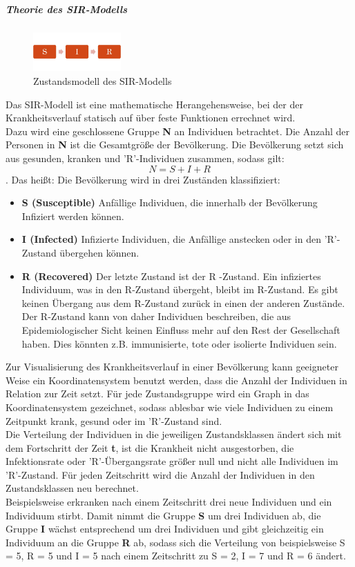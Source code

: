 \subparagraph{Theorie des SIR-Modells}
\begin{figure}
\includegraphics[width= 0.3\textwidth]{./images/SIR-Modell.jpg}\caption{Zustandsmodell des SIR-Modells}
\end{figure}
Das SIR-Modell ist eine mathematische Herangehensweise, bei der der Krankheitsverlauf statisch auf über feste Funktionen errechnet wird. \\
Dazu wird eine geschlossene Gruppe \textbf{N} an Individuen betrachtet. Die Anzahl der Personen in \textbf{N} ist die Gesamtgröße der Bevölkerung. Die Bevölkerung setzt sich aus gesunden, kranken und 'R'-Individuen zusammen, sodass gilt:
\begin{equation}
N = S + I + R
\end{equation}
. Das heißt: Die Bevölkerung wird in drei Zuständen klassifiziert:
\begin{itemize}
\item \textbf{S (Susceptible)} Anfällige Individuen, die innerhalb der Bevölkerung Infiziert werden können.
\item \textbf{I (Infected)} Infizierte Individuen, die Anfällige anstecken  oder in den 'R'-Zustand übergehen können.
\item \textbf{R (Recovered)} Der letzte Zustand ist der \gllqq R \glrqq-Zustand. Ein infiziertes Individuum, was in den \gllqq R\gllqq -Zustand übergeht, bleibt im R-Zustand. Es gibt keinen Übergang aus dem R-Zustand zurück in einen der anderen Zustände. Der R-Zustand kann von daher Individuen beschreiben, die aus Epidemiologischer Sicht keinen Einfluss mehr auf den Rest der Gesellschaft haben. Dies könnten z.B. immunisierte, tote oder isolierte Individuen sein.
\end{itemize}
Zur Visualisierung des Krankheitsverlauf in einer Bevölkerung kann geeigneter Weise ein Koordinatensystem benutzt werden, dass die Anzahl der Individuen in Relation zur Zeit setzt.
Für jede Zustandsgruppe wird ein Graph in das Koordinatensystem gezeichnet, sodass ablesbar wie viele Individuen zu einem Zeitpunkt krank, gesund oder im 'R'-Zustand sind.\\
Die Verteilung der Individuen in die jeweiligen Zustandsklassen ändert sich mit dem Fortschritt der Zeit \textbf{t}, ist die Krankheit nicht ausgestorben, die Infektionsrate oder 'R'-Übergangsrate größer null und nicht alle Individuen im 'R'-Zustand.
Für jeden Zeitschritt wird die Anzahl der Individuen in den Zustandsklassen neu berechnet.\\
Beispielsweise erkranken nach einem Zeitschritt drei neue Individuen und ein Individuum stirbt. Damit nimmt die Gruppe  \textbf{S} um drei Individuen ab, die Gruppe \textbf{I} wächst entsprechend um drei Individuen und gibt gleichzeitig ein Individuum an die Gruppe \textbf{R} ab, sodass sich die Verteilung von beispielsweise S = 5, R = 5 und I = 5 nach einem Zeitschritt zu S = 2, I = 7 und R = 6 ändert.

